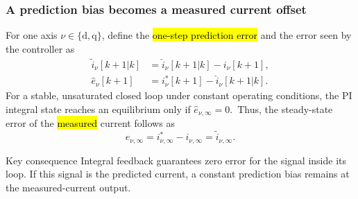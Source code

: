 \begin{frame}
    \frametitle{A prediction bias becomes a measured current offset}
    For one axis $\nu\in\{\mathrm{d},\mathrm{q}\}$, define the \hl{one-step prediction error} and the error seen by the controller as
    \begin{align}
        \widetilde{i}_\nu[k+1|k]
         & =\hat{i}_\nu[k+1|k]-i_\nu[k+1],
        \label{eq:prediction_error_current_control_addendum} \\
        \hat{e}_\nu[k+1]
         & =i_\nu^{*}[k+1]-\hat{i}_\nu[k+1|k].
    \end{align}\pause%
    For a stable, unsaturated closed loop under constant operating conditions, the PI integral state reaches an equilibrium only if $\hat{e}_{\nu,\infty}=0$.\pause\
    Thus, the steady-state error of the \hl{measured} current follows as
    \begin{equation}
        \boxed{e_{\nu,\infty}=i_{\nu,\infty}^{*}-i_{\nu,\infty}
            =\widetilde{i}_{\nu,\infty}.}
        \label{eq:steady_state_prediction_error_addendum}
    \end{equation}\pause%
    \vspace{-0.3cm}
    \begin{varblock}{Key consequence}
        Integral feedback guarantees zero error for the signal inside its loop. If this signal is the predicted current, a constant prediction bias remains at the measured-current output.
    \end{varblock}
\end{frame}

